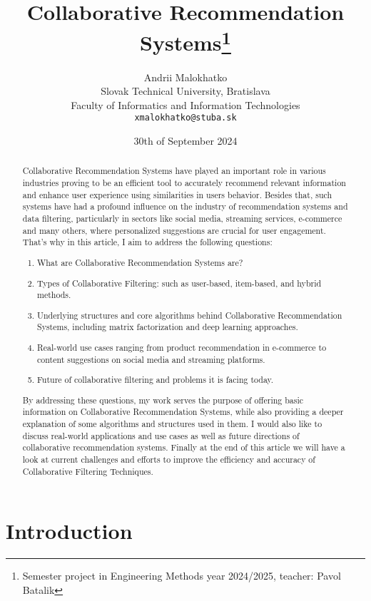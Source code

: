 \documentclass[10pt,a4paper]{article}
\title{Collaborative Recommendation Systems\thanks{Semester project in Engineering Methods year 2024/2025, teacher: Pavol Batalik}} %
\author{Andrii Malokhatko\\[2pt]
	{\small Slovak Technical University, Bratislava}\\
	{\small Faculty of Informatics and Information Technologies}\\
	{\small \texttt{xmalokhatko@stuba.sk}}
	}
\date{\small 30th of September 2024} %
\begin{document}
\maketitle

\begin{abstract}

Collaborative Recommendation Systems have played an important role in various industries proving to be an efficient tool to accurately recommend relevant information and enhance user experience using similarities in users behavior. Besides that, such systems have had a profound influence on the industry of recommendation systems and data filtering, particularly in sectors like social media, streaming services,  e-commerce and many others, where personalized suggestions are crucial for user engagement. That's why in this article, I aim to address the following questions:
\begin{enumerate}
\item What are Collaborative Recommendation Systems are?
\item Types of Collaborative Filtering: such as user-based, item-based, and hybrid methods.
\item Underlying structures and core algorithms behind Collaborative Recommendation Systems, including matrix factorization and deep learning approaches.
\item Real-world use cases ranging from product recommendation in e-commerce to content suggestions on social media and streaming platforms.
\item Future of collaborative filtering and problems it is facing today.
\end{enumerate}

By addressing these questions, my work serves the purpose of offering basic information on Collaborative Recommendation Systems, while also providing a deeper explanation of some algorithms and structures used in them. I would also like to discuss real-world applications and use cases as well as future directions of collaborative recommendation systems. Finally at the end of this article we will have a look at current challenges and efforts to improve the efficiency and accuracy of Collaborative Filtering Techniques.
\clearpage
\end{abstract}



\section{Introduction}
\end{document}
